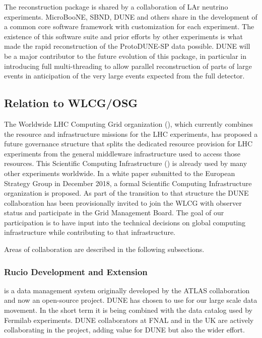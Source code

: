 The   reconstruction package is shared by a collaboration of LAr neutrino experiments.  MicroBooNE, SBND, DUNE and others share in the development of a common core software framework with customization for each experiment. The existence of this software suite and prior efforts by other experiments is what made the rapid reconstruction of the ProtoDUNE-SP data possible.  DUNE will be a major contributor to  the future evolution of this package, in particular in introducing full multi-threading to allow parallel reconstruction of parts of large events in anticipation of the very large events expected from the full detector. 



\subsection{Relation to WLCG/OSG}
The Worldwide LHC Computing Grid organization (), which currently combines the resource and infrastructure missions for the LHC experiments, has proposed a future governance structure that splits the dedicated resource provision for LHC experiments from the general middleware infrastructure used to access those resources.  This Scientific Computing Infrastructure () is already used by many other experiments worldwide.  In a white paper submitted to the European Strategy Group in December 2018, a formal Scientific Computing Infrastructure organization is proposed. As part of the transition to that structure the DUNE collaboration has been provisionally invited to join the WLCG with observer status and participate in the Grid Management Board. The goal of our participation is to have input into the technical decisions on global computing infrastructure while contributing to that infrastructure. 

Areas of collaboration are described in the following subsections. 



\subsubsection{Rucio Development and Extension}

\cite{Barisits:2019fyl}
is a data management system originally developed by the ATLAS collaboration and now an open-source project.  DUNE has chosen to use  for our large scale data movement.  In the short term it is being combined with the  data catalog used by Fermilab experiments.  DUNE collaborators at FNAL and in the UK are actively collaborating in the  project, adding value for DUNE but also the wider effort.



